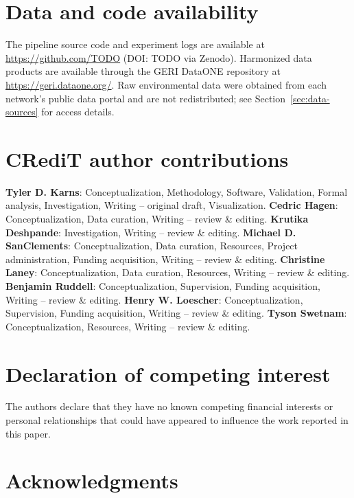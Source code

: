 \documentclass[review,authoryear]{elsarticle}
\begin{document}

\section*{Data and code availability}

The pipeline source code and experiment logs are available at \url{https://github.com/TODO} (DOI: TODO via Zenodo). Harmonized data products are available through the GERI DataONE repository at \url{https://geri.dataone.org/}. Raw environmental data were obtained from each network's public data portal and are not redistributed; see Section~\ref{sec:data-sources} for access details.

\section*{CRediT author contributions}

\textbf{Tyler D. Karns}: Conceptualization, Methodology, Software, Validation, Formal analysis, Investigation, Writing -- original draft, Visualization.
\textbf{Cedric Hagen}: Conceptualization, Data curation, Writing -- review \& editing.
\textbf{Krutika Deshpande}: Investigation, Writing -- review \& editing.
\textbf{Michael D. SanClements}: Conceptualization, Data curation, Resources, Project administration, Funding acquisition, Writing -- review \& editing.
\textbf{Christine Laney}: Conceptualization, Data curation, Resources, Writing -- review \& editing.
\textbf{Benjamin Ruddell}: Conceptualization, Supervision, Funding acquisition, Writing -- review \& editing.
\textbf{Henry W. Loescher}: Conceptualization, Supervision, Funding acquisition, Writing -- review \& editing.
\textbf{Tyson Swetnam}: Conceptualization, Resources, Writing -- review \& editing.

\section*{Declaration of competing interest}

The authors declare that they have no known competing financial interests or personal relationships that could have appeared to influence the work reported in this paper.

\section*{Acknowledgments}
\end{document}

